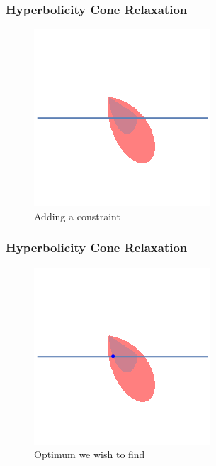 \documentclass{beamer}
\begin{document}
\begin{frame}
    \frametitle{Hyperbolicity Cone Relaxation}
    \begin{figure}[htpb]
        \centering
        \includegraphics[width=0.6\linewidth]{comparison_line_rotated.png}
        \caption{Adding a constraint}%
        \label{fig:comparison_line}
    \end{figure}
\end{frame}
\begin{frame}
    \frametitle{Hyperbolicity Cone Relaxation}
    \begin{figure}[htpb]
        \centering
        \includegraphics[width=0.6\linewidth]{optimum.png}
        \caption{Optimum we wish to find}%
        \label{fig:comparison_line}
    \end{figure}
\end{frame}
\end{document}
